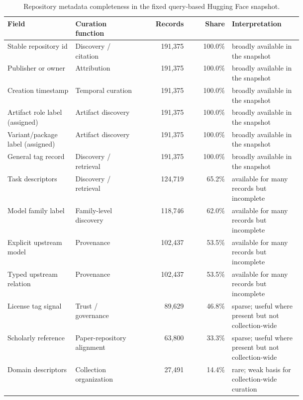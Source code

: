 \begin{table}[t]
\centering
\caption{Repository metadata completeness in the fixed query-based Hugging Face snapshot.}
\label{tab:metadata-completeness}
\small
\begin{tabular}{p{0.23\linewidth}p{0.22\linewidth}r r p{0.24\linewidth}}
\toprule
Field & Curation function & Records & Share & Interpretation \\
\midrule
Stable repository id & Discovery / citation & 191,375 & 100.0\% & broadly available in the snapshot \\
Publisher or owner & Attribution & 191,375 & 100.0\% & broadly available in the snapshot \\
Creation timestamp & Temporal curation & 191,375 & 100.0\% & broadly available in the snapshot \\
Artifact role label (assigned) & Artifact discovery & 191,375 & 100.0\% & broadly available in the snapshot \\
Variant/package label (assigned) & Artifact discovery & 191,375 & 100.0\% & broadly available in the snapshot \\
General tag record & Discovery / retrieval & 191,375 & 100.0\% & broadly available in the snapshot \\
Task descriptors & Discovery / retrieval & 124,719 & 65.2\% & available for many records but incomplete \\
Model family label & Family-level discovery & 118,746 & 62.0\% & available for many records but incomplete \\
Explicit upstream model & Provenance & 102,437 & 53.5\% & available for many records but incomplete \\
Typed upstream relation & Provenance & 102,437 & 53.5\% & available for many records but incomplete \\
License tag signal & Trust / governance & 89,629 & 46.8\% & sparse; useful where present but not collection-wide \\
Scholarly reference & Paper-repository alignment & 63,800 & 33.3\% & sparse; useful where present but not collection-wide \\
Domain descriptors & Collection organization & 27,491 & 14.4\% & rare; weak basis for collection-wide curation \\
\bottomrule
\end{tabular}
\end{table}
